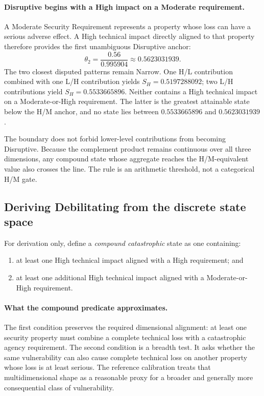 \documentclass[11pt]{article}
\begin{document}
\paragraph{Disruptive begins with a High impact on a Moderate requirement.}
A Moderate Security Requirement represents a property whose loss can have a serious
adverse effect. A High technical impact directly aligned to that property therefore
provides the first unambiguous Disruptive anchor:
\begin{equation}
\boxed{\theta_2=\frac{0.56}{0.995904}\approx0.5623031939}.
\label{eq:theta2}
\end{equation}
The two closest disputed patterns remain Narrow. One H/L contribution combined
with one L/H contribution yields $S_H=0.5197288092$; two L/H contributions yield
$S_H=0.5533665896$. Neither contains a High technical impact on a Moderate-or-High
requirement. The latter is the greatest attainable state below the H/M anchor, and
no state lies between $0.5533665896$ and $0.5623031939$.

The boundary does not forbid lower-level contributions from becoming Disruptive.
Because the complement product remains continuous over all three dimensions, any
compound state whose aggregate reaches the H/M-equivalent value also crosses the
line. The rule is an arithmetic threshold, not a categorical H/M gate.

\subsection{Deriving Debilitating from the discrete state space}

For derivation only, define a \emph{compound catastrophic} state as one containing:

\begin{enumerate}[leftmargin=1.7em]
\item at least one High technical impact aligned with a High requirement; and
\item at least one additional High technical impact aligned with a Moderate-or-High
  requirement.
\end{enumerate}

\paragraph{What the compound predicate approximates.}
The first condition preserves the required dimensional alignment: at least one
security property must combine a complete technical loss with a catastrophic
agency requirement. The second condition is a breadth test. It asks whether the
same vulnerability can also cause complete technical loss on another property whose
loss is at least serious. The reference calibration treats that multidimensional
shape as a reasonable proxy for a broader and generally more consequential class
of vulnerability.
\end{document}
